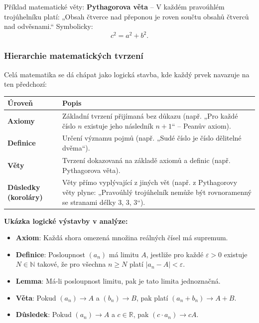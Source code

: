 \documentclass[12pt,a4paper]{article}
\begin{document}
\begin{examplebox}
Příklad matematické věty:  
\textbf{Pythagorova věta} – V každém pravoúhlém trojúhelníku platí:  
„Obsah čtverce nad přeponou je roven součtu obsahů čtverců nad odvěsnami.“  
Symbolicky: \[ c^2 = a^2 + b^2. \]
\end{examplebox}

\subsubsection*{Hierarchie matematických tvrzení}

Celá matematika se dá chápat jako logická stavba, kde každý prvek navazuje na ten předchozí:

\begin{center}
\renewcommand{\arraystretch}{1.4}
\begin{tabular}{|C{3cm}|C{11,5cm}|}
\hline
{}
\textbf{Úroveň} & \textbf{Popis} \\
\hline
\textbf{Axiomy} & Základní tvrzení přijímaná bez důkazu (např. „Pro každé číslo $n$ existuje jeho následník $n+1$“ – Peanův axiom). \\
\hline
\textbf{Definice} & Určení významu pojmů (např. „Sudé číslo je číslo dělitelné dvěma“). \\
\hline
\textbf{Věty} & Tvrzení dokazovaná na základě axiomů a definic (např. Pythagorova věta). \\
\hline
\textbf{Důsledky (koroláry)} & Věty přímo vyplývající z jiných vět (např. z Pythagorovy věty plyne: „Pravoúhlý trojúhelník nemůže být rovnoramenný se stranami délky 3, 3, 3“). \\
\hline
\end{tabular}
\end{center}

\begin{examplebox}
\textbf{Ukázka logické výstavby v analýze:}

\begin{itemize}
    \item \textbf{Axiom}: Každá shora omezená množina reálných čísel má supremum.  
    \item \textbf{Definice}: Posloupnost $(a_n)$ má limitu $A$, jestliže pro každé $\varepsilon > 0$ existuje $N \in \mathbb{N}$ takové, že pro všechna $n \geq N$ platí $|a_n - A| < \varepsilon$.  
    \item \textbf{Lemma}: Má-li posloupnost limitu, pak je tato limita jednoznačná.  
    \item \textbf{Věta}: Pokud $(a_n) \to A$ a $(b_n) \to B$, pak platí $(a_n + b_n) \to A + B$.  
    \item \textbf{Důsledek}: Pokud $(a_n) \to A$ a $c \in \mathbb{R}$, pak $(c \cdot a_n) \to cA$.
\end{itemize}
\end{examplebox}
\end{document}
